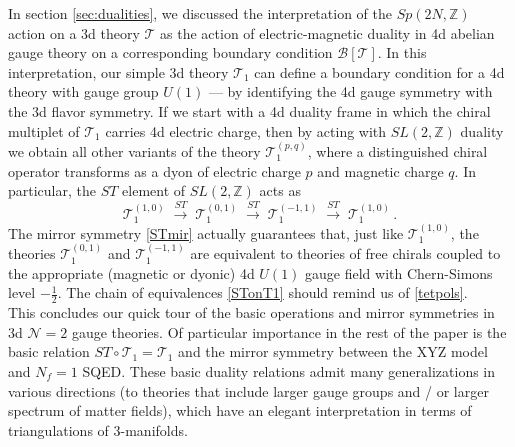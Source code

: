 \documentclass[hyper,letterpaper]{JHEP3}
\numberwithin{equation}{section}
\newcommand{\be}{\begin{equation}}
\newcommand{\ee}{\end{equation}}
\newcommand{\Z}{{\mathbb Z}}
\newcommand{\CB}{\mathcal{B}}
\newcommand{\CN}{\mathcal{N}}
\newcommand{\CT}{\mathcal{T}}
\begin{document}
In section \ref{sec:dualities}, we discussed the interpretation of the $Sp(2N,\Z)$ action on a 3d theory $\CT$
as the action of electric-magnetic duality in 4d abelian gauge theory on a corresponding boundary condition $\CB[\CT]$.
In this interpretation, our simple 3d theory $\CT_1$ can define a boundary condition for a 4d theory with gauge group $U(1)$ --- by identifying the 4d gauge symmetry with the 3d flavor symmetry. If we start with a 4d duality frame in which the chiral multiplet of $\CT_1$ carries 4d electric charge,
then by acting with $SL(2,\Z)$ duality we obtain all other variants of the theory $\CT_1^{(p,q)}$,
where a distinguished chiral operator transforms as a dyon of electric charge $p$ and magnetic charge $q$.
In particular, the $ST$ element of $SL(2,\Z)$ acts as
\be
\CT_1^{(1,0)} \; \xrightarrow{ST} \;
\CT_1^{(0,1)} \; \xrightarrow{ST} \;
\CT_1^{(-1,1)} \; \xrightarrow{ST} \;
\CT_1^{(1,0)}\,.
\label{STonT1}
\ee
The mirror symmetry \eqref{STmir} actually guarantees that, just like $\CT_1^{(1,0)}$, the theories $\CT_1^{(0,1)}$ and $\CT_1^{(-1,1)}$ are equivalent to theories of free chirals coupled to the appropriate (magnetic or dyonic) 4d $U(1)$ gauge field with Chern-Simons level $-\frac12$. The chain of equivalences \eqref{STonT1} should remind us of \eqref{tetpols}. \\


This concludes our quick tour of the basic operations and mirror symmetries in 3d $\CN=2$ gauge theories.
Of particular importance in the rest of the paper is the basic relation $ST \circ \CT_1 = \CT_1$
and the mirror symmetry between the XYZ model and $N_f=1$ SQED. These basic duality relations admit
many generalizations in various directions (to theories that include larger gauge groups and / or larger spectrum of matter fields),
which have an elegant interpretation in terms of triangulations of 3-manifolds.
\end{document}
